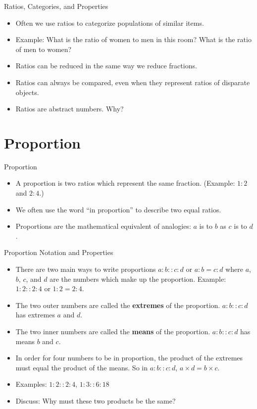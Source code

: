 \documentclass[]{beamer}
\begin{document}
\begin{frame}{Ratios, Categories, and Properties}
\begin{itemize}
    \item<2-> Often we use ratios to categorize populations of similar items.
    \item<3-> Example:  What is the ratio of women to men in this room? What is the ratio of men to women?
        \newline{}
    \item<5-> Ratios can be reduced in the same way we reduce fractions.
    \item<6-> Ratios can always be compared, even when they represent ratios of disparate objects.
    \item<7-> Ratios are abstract numbers. Why?
\end{itemize}
\end{frame}


\section{Proportion}
\begin{frame}{Proportion}
\begin{itemize}[<+->]
  \item A proportion is two ratios which represent the same fraction.  (Example: $1:2$ and $2:4$.)
  \item We often use the word ``in proportion'' to describe two equal ratios.
  \item Proportions are the mathematical equivalent of analogies: $a$ is to $b$ as $c$ is to $d$.
\end{itemize}
\end{frame}


\begin{frame}{Proportion Notation and Properties}
\begin{itemize}[<+->]
    \item There are two main ways to write proportions $a:b :: c:d$ or $a:b = c:d$ where $a$, $b$, $c$, and $d$ are the numbers which make up the proportion.  Example: $1:2::2:4$ or $1:2=2:4$.
    \item The two outer numbers are called the {\bf extremes} of the proportion.  $a:b::c:d$ has extremes $a$ and $d$.
    \item The two inner numbers are called the {\bf means} of the proportion.  $a:b::c:d$ has means $b$ and $c$.
    \item In order for four numbers to be in proportion, the product of the extremes must equal the product of the means.  So in $a:b::c:d$, $a\times d = b \times c$.
    \item Examples: $1:2::2:4$, $1:3::6:18$
    \item Discuss: Why must these two products be the same?
\end{itemize}
\end{frame}
\end{document}
